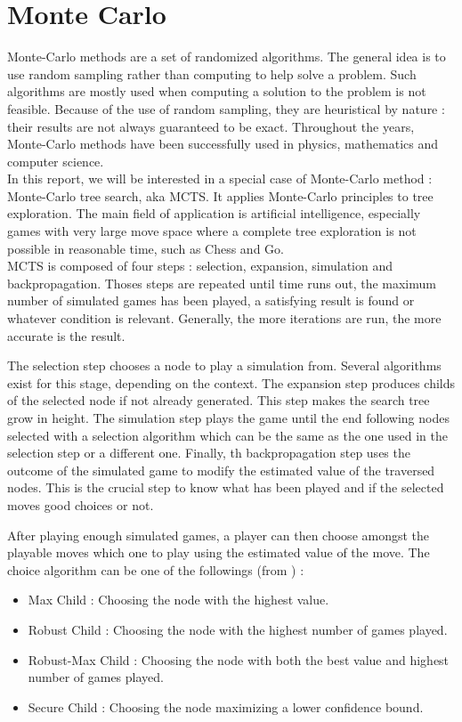 \section{Monte Carlo}

Monte-Carlo methods are a set of randomized algorithms. The general idea is to use random sampling rather than computing to help solve a problem. Such algorithms are mostly used when computing a solution to the problem is not feasible. Because of the use of random sampling, they are heuristical by nature : their results are not always guaranteed to be exact. Throughout the years, Monte-Carlo methods have been successfully used in physics, mathematics  and computer science.\\


In this report, we will be interested in a special case of Monte-Carlo method : Monte-Carlo tree search, aka MCTS. It applies Monte-Carlo principles to tree exploration. The main field of application is artificial intelligence, especially games with very large move space where a complete tree exploration is not possible in reasonable time, such as Chess and Go.\\

MCTS is composed of four steps : selection, expansion, simulation and backpropagation. Thoses steps are repeated until time runs out, the maximum number of simulated games has been played, a satisfying result is found or whatever condition is relevant. Generally, the more iterations are run, the more accurate is the result.

The selection step chooses a node to play a simulation from. Several algorithms exist for this stage, depending on the context. The expansion step produces childs of the selected node if not already generated. This step makes the search tree grow in height. The simulation step plays the game until the end following nodes selected with a selection algorithm which can be the same as the one used in the selection step or a different one. Finally, th backpropagation step uses the outcome of the simulated game to modify the estimated value of the traversed nodes. This is the crucial step to know what has been played and if the selected moves good choices or not.

After playing enough simulated games, a player can then choose amongst the playable moves which one to play using the estimated value of the move. The choice algorithm can be one of the followings (from \cite{ChaPHD}) :
\begin{itemize}
\item Max Child : Choosing the node with the highest value.
\item Robust Child : Choosing the node with the highest number of games played.
\item Robust-Max Child : Choosing the node with both the best value and highest number of games played.
\item Secure Child : Choosing the node maximizing a lower confidence bound.\\
\end{itemize}


